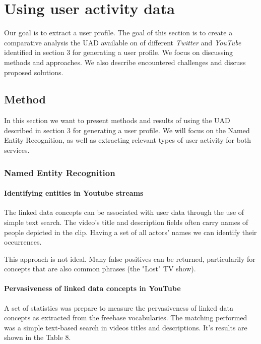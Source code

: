 \section{Using user activity data}
Our goal is to extract a user profile. The goal of this section is to create a comparative analysis the UAD
available on of different \textit{Twitter} and \textit{YouTube} identified in section 3 for generating a user profile.
We focus on discussing methods and approaches. We also describe encountered challenges and discuss proposed solutions.

\subsection{Method}
In this section we want to present methods and results of using the UAD described in section 3 for generating a user
profile. We will focus on the Named Entity Recognition, as well as extracting relevant types of user activity
for both services.

\subsubsection{Named Entity Recognition}

\paragraph{Identifying entities in Youtube streams}
The linked data concepts can be associated with user data through the use of
simple text search. The video's title and description fields often carry names
of people depicted in the clip. Having a set of all actors' names we can
identify their occurrences.

This approach is not ideal. Many false positives can be returned, particularily
for concepts that are also common phrases (\eg the "Lost" TV show).

\paragraph{Pervasiveness of linked data concepts in YouTube}
A set of statistics was prepare to measure the pervasiveness of linked data
concepts as extracted from the freebase vocabularies. The matching performed
was a simple text-based search in videos titles and descriptions. It's results
are shown in the Table 8.


